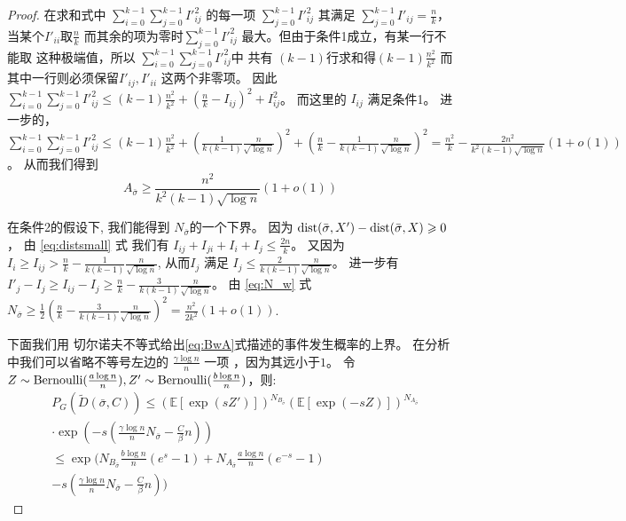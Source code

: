 \begin{proof}
    在求和式中 $\sum_{i=0}^{k-1} \sum_{j=0}^{k-1} I'^2_{ij}$
    的每一项 $\sum_{j=0}^{k-1} I'^2_{ij}$ 其满足 $\sum_{j=0}^{k-1}
    I'_{ij} = \frac{n}{k}$，当某个$I'_{ii}$取$\frac{n}{k}$
    而其余的项为零时$\sum_{j=0}^{k-1} I'^2_{ij}$
    最大。但由于条件1成立，有某一行不能取
    这种极端值，所以 $\sum_{i=0}^{k-1} \sum_{j=0}^{k-1} I'^2_{ij}$中
    共有 $(k-1)$行求和得$ (k-1)\frac{n^2}{k^2}$
    而其中一行则必须保留$I'_{ij}, I'_{ii}$ 这两个非零项。
    因此 $\sum_{i=0}^{k-1} \sum_{j=0}^{k-1} I'^2_{ij}
    \leq (k-1)\frac{n^2}{k^2} + (\frac{n}{k} - I_{ij})^2 + I^2_{ij}$。
    而这里的
    $I_{ij}$ 满足条件1。
    进一步的， $\sum_{i=0}^{k-1} \sum_{j=0}^{k-1} I'^2_{ij} \leq (k-1)\frac{n^2}{k^2} + (\frac{1}{k(k-1)}\frac{n}{\sqrt{\log n}})^2
    + (\frac{n}{k} - \frac{1}{k(k-1)}\frac{n}{\sqrt{\log n}})^2 = \frac{n^2}{k} - \frac{2n^2}{k^2 (k-1)\sqrt{\log n}}(1+o(1))$。
    从而我们得到
  \begin{equation}\label{eq:Asigma}
    A_{\bar{\sigma}} \geq \frac{n^2}{k^2 (k-1)\sqrt{\log n}}(1+o(1))
    \end{equation}
    
    
    在条件2的假设下, 我们能得到
    $N_{\bar{\sigma}}$的一个下界。
    因为
    $\operatorname{dist}(\bar{\sigma}, X') - \operatorname{dist}(\bar{\sigma}, X) \geqslant 0$，
     由 \eqref{eq:distsmall} 式 我们有
    $I_{ij} + I_{ji} + I_{i} + I_j \leq \frac{2n}{k} $。
    又因为 $I_i \geq I_{ij} > \frac{n}{k} - \frac{1}{k(k-1)}\frac{n}{\sqrt{\log n}}$,
    从而$I_j $ 满足
    $I_j \leq \frac{2}{k(k-1)}\frac{n}{\sqrt{\log n} }$。
    进一步有 $I'_j - I_j \geq I_{ij} - I_j \geq  \frac{n}{k} - \frac{3}{k(k-1)}\frac{n}{\sqrt{\log n} }$。
    由 \eqref{eq:N_w}
    式 $N_{\bar{\sigma}} \geq \frac{1}{2}(\frac{n}{k} - \frac{3}{k(k-1)}\frac{n}{\sqrt{\log n}})^2 = \frac{n^2}{2k^2}(1+o(1))$.
    
    下面我们用
     切尔诺夫不等式给出\eqref{eq:BwA}式描述的事件发生概率的上界。
     在分析中我们可以省略不等号左边的 $\frac{\gamma \log n}{n}$ 一项
     ，因为其远小于$1$。
    令 $Z \sim \textrm{Bernoulli}(\frac{a \log n}{n}), Z' \sim \textrm{Bernoulli}(\frac{b \log n}{n})$，则:
    \begin{align*}
    &P_G(\widetilde{D}(\bar{\sigma}, C))
    \leq (\mathbb{E}[\exp(sZ')])^{N_{B_{\bar{\sigma}}}}
    (\mathbb{E}[\exp(-sZ)])^{N_{A_{\bar{\sigma}}}}\\
    &\cdot \exp(-s(\frac{\gamma \log n}{n} N_{\bar{\sigma}}  - \frac{C}{\beta}n)) \\
    & \leq \exp\Big(N_{B_{\bar{\sigma}}}
    \frac{b\log n}{n}(e^s -1) + N_{A_{\bar{\sigma}}}\frac{a\log n}{n} (e^{-s} - 1) \\
    &-s(\frac{\gamma \log n}{n} N_{\bar{\sigma}}  - \frac{C}{\beta}n)\Big) 
    \end{align*}
    

\end{proof}
